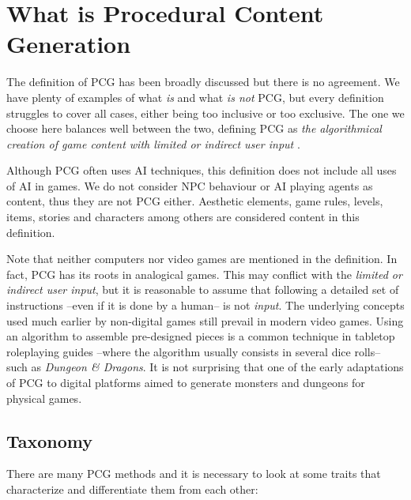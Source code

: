 \section{What is Procedural Content Generation}
The definition of \acf{PCG} has been broadly discussed but there is no agreement. We have plenty of examples of what \textit{is} and what \textit{is not} \ac{PCG}, but every definition struggles to cover all cases, either being too inclusive or too exclusive. The one we choose here balances well between the two, defining \ac{PCG} as \textit{the algorithmical creation of game content with limited or indirect user input} \cite{togelius2011procedural}.

Although \ac{PCG} often uses AI techniques, this definition does not include all uses of AI in games. We do not consider \acs{NPC} behaviour or AI playing agents as content, thus they are not \ac{PCG} either. Aesthetic elements, game rules, levels, items, stories and characters among others are considered content in this definition.

Note that neither computers nor video games are mentioned in the definition. In fact, \ac{PCG} has its roots in analogical games. This may conflict with the \textit{limited or indirect user input}, but it is reasonable to assume that following a detailed set of instructions --even if it is done by a human-- is not \textit{input}. The underlying concepts used much earlier by non-digital games still prevail in modern video games. Using an algorithm to assemble pre-designed pieces is a common technique in tabletop roleplaying guides --where the algorithm usually consists in several dice rolls-- such as \textit{Dungeon \& Dragons}. It is not surprising that one of the early adaptations of \ac{PCG} to digital platforms aimed to generate monsters and dungeons for physical games.\cite{smith2015analog}

\subsection{Taxonomy}
There are many \ac{PCG} methods and it is necessary to look at some traits that characterize and differentiate them from each other: \cite{togelius2016introduction}

